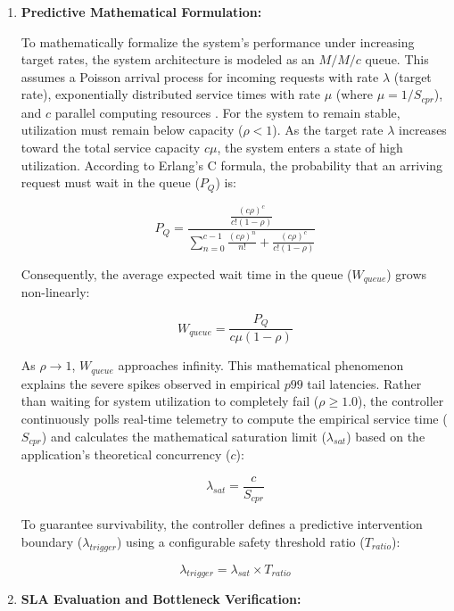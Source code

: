 \documentclass{ieeeaccess}
\begin{document}
\begin{enumerate}
	\item \textbf{Predictive Mathematical Formulation:} 
	
	To mathematically formalize the system's performance under increasing target rates, the system architecture is modeled as an $M/M/c$ queue. This assumes a Poisson arrival process for incoming requests with rate $\lambda$ (target rate), exponentially distributed service times with rate $\mu$ (where $\mu = 1 / S_{cpr}$), and $c$ parallel computing resources \cite{tijms2003first} \cite{Banerjee2023MTDDHJSMTA}. For the system to remain stable, utilization must remain below capacity ($\rho < 1$). As the target rate $\lambda$ increases toward the total service capacity $c\mu$, the system enters a state of high utilization. According to Erlang's C formula, the probability that an arriving request must wait in the queue ($P_Q$) is:

	\begin{equation}
		P_Q = \frac{\frac{(c\rho)^c}{c!(1-\rho)}}{\sum_{n=0}^{c-1} \frac{(c\rho)^n}{n!} + \frac{(c\rho)^c}{c!(1-\rho)}}
	\end{equation}

	Consequently, the average expected wait time in the queue ($W_{queue}$) grows non-linearly:

	$$W_{queue} = \frac{P_Q}{c\mu(1-\rho)}$$

	As $\rho \to 1$, $W_{queue}$ approaches infinity. This mathematical phenomenon explains the severe spikes observed in empirical $p99$ tail latencies. Rather than waiting for system utilization to completely fail ($\rho \ge 1.0$), the controller continuously polls real-time telemetry to compute the empirical service time ($S_{cpr}$) and calculates the mathematical saturation limit ($\lambda_{sat}$) based on the application's theoretical concurrency ($c$):

	$$\lambda_{sat} = \frac{c}{S_{cpr}}$$

	To guarantee survivability, the controller defines a predictive intervention boundary ($\lambda_{trigger}$) using a configurable safety threshold ratio ($T_{ratio}$):

	$$\lambda_{trigger} = \lambda_{sat} \times T_{ratio}$$

	\item \textbf{SLA Evaluation and Bottleneck Verification:} 
	

\end{enumerate}
\end{document}
